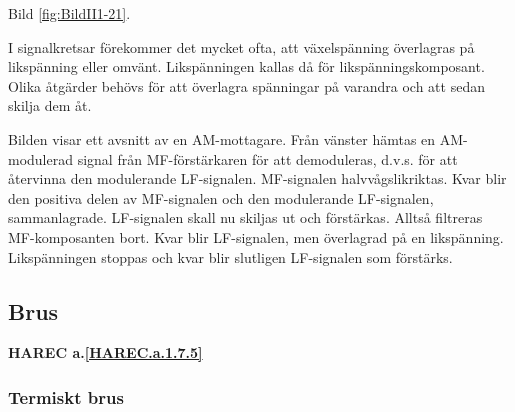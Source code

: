 Bild \ref{fig:BildII1-21}.

I signalkretsar förekommer det mycket ofta, att växelspänning överlagras på
likspänning eller omvänt. Likspänningen kallas då för likspänningskomposant.
Olika åtgärder behövs för att överlagra spänningar på varandra och att sedan
skilja dem åt.

Bilden visar ett avsnitt av en AM-mottagare. Från vänster hämtas en
AM-modulerad signal från MF-förstärkaren för att demoduleras, d.v.s. för att
återvinna den modulerande LF-signalen. MF-signalen halvvågslikriktas. Kvar blir
den positiva delen av MF-signalen och den modulerande LF-signalen,
sammanlagrade. LF-signalen skall nu skiljas ut och förstärkas. Alltså filtreras
MF-komposanten bort. Kvar blir LF-signalen, men överlagrad på en likspänning.
Likspänningen stoppas och kvar blir slutligen LF-signalen som förstärks.

\subsection{Brus}
\textbf{HAREC a.\ref{HAREC.a.1.7.5}\label{myHAREC.a.1.7.5}}

\subsubsection{Termiskt brus}

